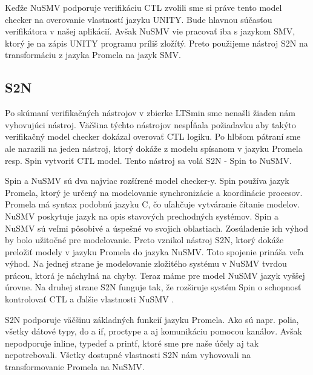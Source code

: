 Keďže NuSMV podporuje verifikáciu CTL zvolili sme si práve tento model checker na overovanie vlastností 
jazyku UNITY. Bude hlavnou súčasťou verifikátora v našej aplikácií. Avšak NuSMV vie pracovať iba s jazykom SMV, 
ktorý je na zápis UNITY programu príliš zložítý. Preto použijeme nástroj S2N na transformáciu z jazyka Promela
na jazyk SMV.

\subsection{S2N}
Po skúmaní verifikačných nástrojov v zbierke LTSmin sme nenašli žiaden nám vyhovujúci nástroj. Väčšina týchto
nástrojov nespĺňala požiadavku aby takýto verifikačný model checker dokázal overovať CTL logiku.
Po hlbšom pátraní sme ale narazili na jeden nástroj, ktorý dokáže z modelu spísanom v jazyku Promela resp. Spin 
vytvoriť CTL model. Tento nástroj sa volá S2N - Spin to NuSMV. 

Spin a NuSMV sú dva najviac rozšírené model checker-y. Spin používa jazyk Promela, ktorý je určený 
na modelovanie synchronizácie a koordinácie procesov. Promela má syntax podobnú jazyku C, čo uľahčuje vytváranie
čítanie modelov. NuSMV poskytuje jazyk na opis stavových prechodných systémov. Spin a NuSMV sú veľmi pôsobivé 
a úspešné vo svojich oblastiach. Zosúladenie ich výhod by bolo užitočné pre modelovanie. Preto vznikol
nástroj S2N, ktorý dokáže preložiť modely v jazyku Promela do jazyka NuSMV. Toto spojenie prináša veľa 
výhod. Na jednej strane je modelovanie zložitého systému v NuSMV tvrdou prácou, ktorá je náchylná na chyby. 
Teraz máme pre model NuSMV jazyk vyššej úrovne. Na druhej strane S2N funguje tak, že rozširuje systém 
Spin o schopnosť kontrolovať CTL a ďalšie vlastnosti NuSMV \cite{br7}.

S2N podporuje väčšinu základných funkcií jazyku Promela. Ako sú napr. polia, všetky dátové typy, do a if, 
proctype a aj komunikáciu pomocou kanálov. Avšak nepodporuje inline, typedef a printf, ktoré sme pre naše účely
aj tak nepotrebovali. Všetky dostupné vlastnosti S2N nám vyhovovali na transformovanie Promela na NuSMV.